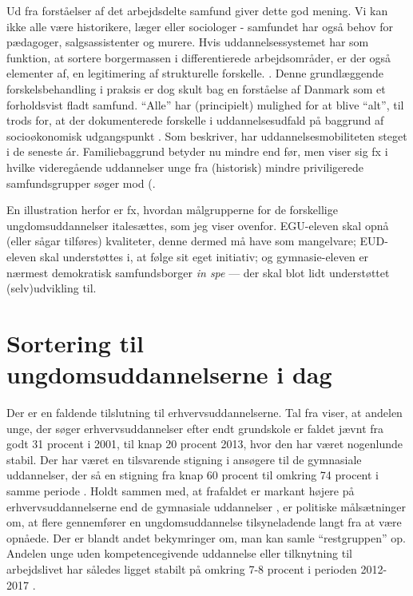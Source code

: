Ud fra forståelser af det arbejdsdelte samfund giver dette god mening.
Vi kan ikke alle være historikere, læger eller sociologer - samfundet har også behov for pædagoger, salgsassistenter og murere.
Hvis uddannelsessystemet har som funktion, at sortere borgermassen i differentierede arbejdsområder, er der også elementer af, en legitimering af strukturelle forskelle. .
Denne grundlæggende forskelsbehandling i praksis er dog skult bag en forståelse af Danmark som et forholdsvist fladt samfund.
“Alle” har (principielt) mulighed for at blive “alt”, til trods for, at der dokumenterede forskelle i uddannelsesudfald på baggrund af socioøkonomisk udgangspunkt \autocite[se fx s 195ff i]{munkSocialUlighedOg2014}.
Som \citeauthor{munkSocialUlighedOg2014} beskriver, har uddannelsesmobiliteten steget i de seneste ár.
Familiebaggrund betyder nu mindre end før, men viser sig fx i hvilke videregående uddannelser unge fra (historisk) mindre priviligerede samfundsgrupper søger mod (\citeyear[s. 199]{munkSocialUlighedOg2014}.

En illustration herfor er fx, hvordan målgrupperne for de forskellige ungdomsuddannelser italesættes, som jeg viser ovenfor.
EGU-eleven skal opnå (eller sågar tilføres) kvaliteter, denne dermed må have som mangelvare; EUD-eleven skal understøttes i, at følge sit eget initiativ; og gymnasie-eleven er nærmest demokratisk samfundsborger \textit{in spe} — der skal blot lidt understøttet (selv)udvikling til. 

\chapter{Sortering til ungdomsuddannelserne i dag}\label{chap:sorting}

Der er en faldende tilslutning til erhvervsuddannelserne.
Tal fra \citeauthor{borne-ogundervisningsministerietSogning} viser, at andelen unge, der søger erhvervsuddannelser efter endt grundskole er faldet jævnt fra godt 31 procent i 2001, til knap 20 procent 2013, hvor den har været nogenlunde stabil.
Der har været en tilsvarende stigning i ansøgere til de gymnasiale uddannelser, der så en stigning fra knap 60 procent til omkring 74 procent i samme periode \autocite[s 5f]{undervisningsministerietOg10Klasseelevernes2017}.
Holdt sammen med, at frafaldet er markant højere på erhvervsuddannelserne end de gymnasiale uddannelser \autocite{danskegymnasierFuldforelseOgKarakterer2019}, er politiske målsætninger om, at flere gennemfører en ungdomsuddannelse tilsyneladende langt fra at være opnåede.
Der er blandt andet bekymringer om, man kan samle “restgruppen” op.
Andelen unge uden kompetencegivende uddannelse eller tilknytning til arbejdslivet har således ligget stabilt på omkring 7-8 procent i perioden 2012-2017 \autocite[s. 9]{andersenUngeUdenUddannelse2019}.

